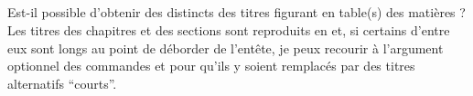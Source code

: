 \subsection[Titres courants]{\texorpdfstring{}{Titres courants}}
\label{sec-titres-courants}

\begin{dbfaq}{Est-il possible d'obtenir des  distincts
    des titres figurant en table(s) des matières ?}{}
  Les titres des chapitres et des sections sont reproduits en
   et, si certains d'entre eux sont longs au point de
  déborder de l'entête, je peux recourir à l'argument optionnel des commandes
   et  pour qu'ils y soient
  remplacés par des titres alternatifs \enquote{courts}.


\end{dbfaq}
